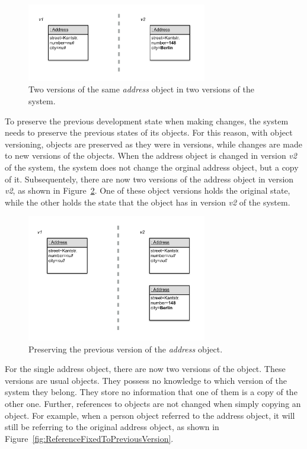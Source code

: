 \begin{figure}[h]
    \centering
    \includegraphics[width=0.7\textwidth]{figures/4_approach/2_objectChange.pdf}
    \caption{Two versions of the same \emph{address} object in two versions of the system.}
    \label{fig:ObjectChanged}
\end{figure}

To preserve the previous development state when making changes, the system needs to preserve the previous states of its objects.
For this reason, with object versioning, objects are preserved as they were in versions, while changes are made to new versions of the objects.
When the address object is changed in version \emph{v2} of the system, the system does not change the orginal address object, but a copy of it.
Subsequentely, there are now two versions of the address object in version \emph{v2}, as shown in Figure~\ref{fig:VersionPreserved}.
One of these object versions holds the original state, while the other holds the state that the object has in version \emph{v2} of the system.

\begin{figure}[h]
    \centering
    \includegraphics[width=0.7\textwidth]{figures/4_approach/3_previousVersionPreserved.pdf}
    \caption{Preserving the previous version of the \emph{address} object.}
    \label{fig:VersionPreserved}
\end{figure}

For the single address object, there are now two versions of the object.
These versions are usual objects.
They possess no knowledge to which version of the system they belong.
They store no information that one of them is a copy of the other one.
Further, references to objects are not changed when simply copying an object.
For example, when a person object referred to the address object, it will still be referring to the original address object, as shown in Figure~\ref{fig:ReferenceFixedToPreviousVersion}.

